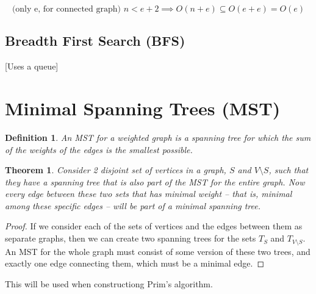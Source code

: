 \documentclass{article}
\newtheorem{definition}{Definition}
\newtheorem{theorem}{Theorem}
\begin{document}
        $$\text{(only e, for connected graph) } n < e + 2 \implies O(n + e)
        \subseteq O(e + e) = O(e)$$

    \subsection{Breadth First Search (BFS)}

        [Uses a queue]
        
\section{Minimal Spanning Trees (MST)}

    \begin{definition}
        An MST for a weighted graph is a spanning tree for which the sum of the
        weights of the edges is the smallest possible.
    \end{definition}

    \begin{theorem}
        Consider 2 disjoint set of vertices in a graph, $S$ and $V \setminus
        S$, such that they have a spanning tree that is also part of the MST
        for the entire graph. Now every edge between these two sets that has
        minimal weight – that is, minimal among these specific edges – will be
        part of a minimal spanning tree.
    \end{theorem}

    \begin{proof}
        If we consider each of the sets of vertices and the edges between them
        as separate graphs, then we can create two spanning trees for the sets
        $T_S$ and $T_{V \setminus S}$. An MST for the whole graph must consist
        of some version of these two trees, and exactly one edge connecting
        them, which must be a minimal edge.
    \end{proof}

    This will be used when constructiong Prim's algorithm.

 


\end{document}
